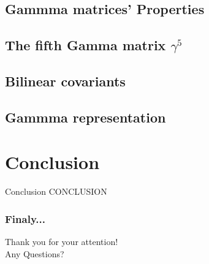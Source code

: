 \documentclass[serif,11pt]{beamer}
\begin{document}
\subsection{Gammma matrices' Properties}

\subsection{The fifth Gamma matrix $\gamma^5$}

\subsection{Bilinear covariants}

\subsection{Gammma representation}

\section{Conclusion}
\begin{frame}{Conclusion}
CONCLUSION
\end{frame}




\begin{frame}\frametitle{Finaly...}
\centering

Thank you for your attention!\\
Any Questions?
\end{frame}



\end{document}
